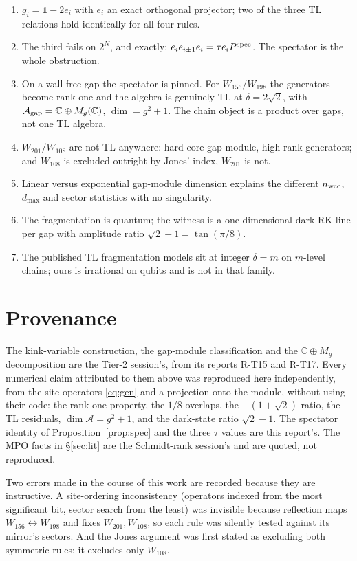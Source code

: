 \documentclass[11pt]{article}
\newcommand{\A}{\mathcal{A}}
\theoremstyle{plain}
\theoremstyle{remark}
\begin{document}
\begin{enumerate}
\item $g_i = \mathbb{1} - 2e_i$ with $e_i$ an exact orthogonal projector; two of
the three TL relations hold identically for all four rules.
\item The third fails on $2^N$, and exactly: $e_ie_{i\pm1}e_i = \tau e_i P^{\rm
spec}$. The spectator is the whole obstruction.
\item On a wall-free gap the spectator is pinned. For $W_{156}/W_{198}$ the
generators become rank one and the algebra is genuinely TL at $\delta = 2\sqrt2$,
with $\A_{\rm gap} = \mathbb{C}\oplus M_g(\mathbb{C})$, $\dim = g^2+1$. The chain
object is a product over gaps, not one TL algebra.
\item $W_{201}/W_{108}$ are not TL anywhere: hard-core gap module, high-rank
generators; and $W_{108}$ is excluded outright by Jones' index, $W_{201}$ is not.
\item Linear versus exponential gap-module dimension explains the different
$n_{\rm wcc}$, $d_{\max}$ and sector statistics with no singularity.
\item The fragmentation is quantum; the witness is a one-dimensional dark RK line
per gap with amplitude ratio $\sqrt2-1 = \tan(\pi/8)$.
\item The published TL fragmentation models sit at integer $\delta = m$ on
$m$-level chains; ours is irrational on qubits and is not in that family.
\end{enumerate}

\section*{Provenance}

The kink-variable construction, the gap-module classification and the
$\mathbb{C}\oplus M_g$ decomposition are the Tier-2 session's, from its reports
R-T15 and R-T17. Every numerical claim attributed to them above was reproduced
here independently, from the site operators \eqref{eq:gen} and a projection onto
the module, without using their code: the rank-one property, the $1/8$ overlaps,
the $-(1+\sqrt2)$ ratio, the TL residuals, $\dim\A = g^2+1$, and the dark-state
ratio $\sqrt2-1$. The spectator identity of Proposition~\ref{prop:spec} and the
three $\tau$ values are this report's. The MPO facts in \S\ref{sec:lit} are the
Schmidt-rank session's and are quoted, not reproduced.

Two errors made in the course of this work are recorded because they are
instructive. A site-ordering inconsistency (operators indexed from the most
significant bit, sector search from the least) was invisible because reflection
maps $W_{156}\leftrightarrow W_{198}$ and fixes $W_{201}, W_{108}$, so each rule
was silently tested against its mirror's sectors. And the Jones argument was
first stated as excluding both symmetric rules; it excludes only $W_{108}$.
\end{document}

